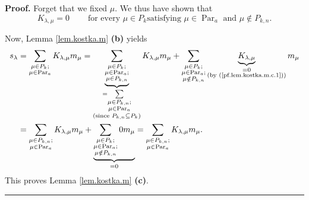 \documentclass[numbers=enddot,12pt,final,onecolumn,notitlepage]{scrartcl}%
\theoremstyle{definition}
\newenvironment{proof}[1][Proof]{\noindent\textbf{#1.} }{\ \rule{0.5em}{0.5em}}
\let\sumnonlimits\sum
\renewcommand{\sum}{\sumnonlimits\limits}
\begin{document}
\begin{proof}
Forget that we fixed $\mu$. We thus have shown that%
\begin{equation}
K_{\lambda,\mu}=0\ \ \ \ \ \ \ \ \ \ \text{for every }\mu\in P_{k}\text{
satisfying }\mu\in\operatorname*{Par}\nolimits_{a}\text{ and }\mu\notin
P_{k,n}. \label{pf.lem.kostka.m.c.1}%
\end{equation}


Now, Lemma \ref{lem.kostka.m} \textbf{(b)} yields%
\begin{align*}
s_{\lambda}  &  =\sum_{\substack{\mu\in P_{k};\\\mu\in\operatorname*{Par}%
\nolimits_{a}}}K_{\lambda,\mu}m_{\mu}=\underbrace{\sum_{\substack{\mu\in
P_{k};\\\mu\in\operatorname*{Par}\nolimits_{a};\\\mu\in P_{k,n}}%
}}_{\substack{=\sum_{\substack{\mu\in P_{k,n};\\\mu\in\operatorname*{Par}%
\nolimits_{a}}}\\\text{(since }P_{k,n}\subseteq P_{k}\text{)}}}K_{\lambda,\mu
}m_{\mu}+\sum_{\substack{\mu\in P_{k};\\\mu\in\operatorname*{Par}%
\nolimits_{a};\\\mu\notin P_{k,n}}}\underbrace{K_{\lambda,\mu}}%
_{\substack{=0\\\text{(by (\ref{pf.lem.kostka.m.c.1}))}}}m_{\mu}\\
&  =\sum_{\substack{\mu\in P_{k,n};\\\mu\in\operatorname*{Par}\nolimits_{a}%
}}K_{\lambda,\mu}m_{\mu}+\underbrace{\sum_{\substack{\mu\in P_{k};\\\mu
\in\operatorname*{Par}\nolimits_{a};\\\mu\notin P_{k,n}}}0m_{\mu}}_{=0}%
=\sum_{\substack{\mu\in P_{k,n};\\\mu\in\operatorname*{Par}\nolimits_{a}%
}}K_{\lambda,\mu}m_{\mu}.
\end{align*}
This proves Lemma \ref{lem.kostka.m} \textbf{(c)}.
\end{proof}
\end{document}
